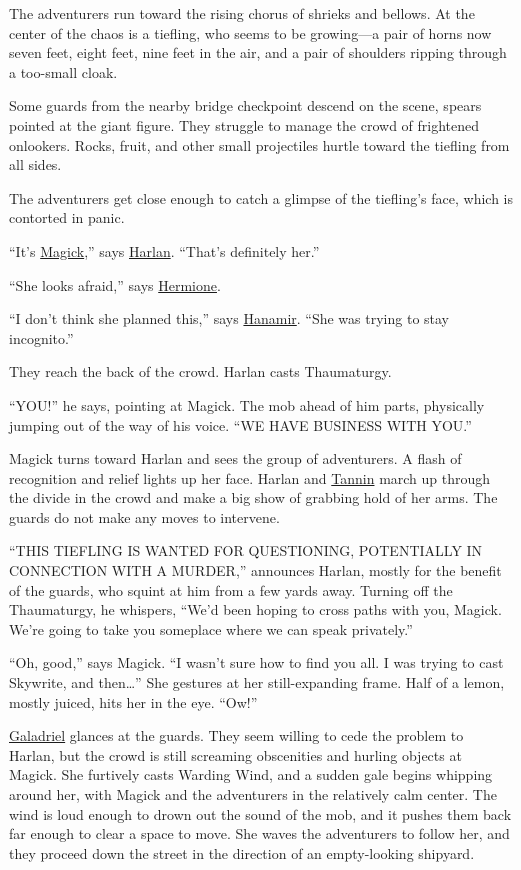 \documentclass[smalldemyvopaper,11pt,twoside,onecolumn,openright,extrafontsizes]{memoir}
\begin{document}
The adventurers run toward the rising chorus of shrieks and bellows. At
the center of the chaos is a tiefling, who seems to be growing---a pair
of horns now seven feet, eight feet, nine feet in the air, and a pair of
shoulders ripping through a too-small cloak.

Some guards from the nearby bridge checkpoint descend on the scene,
spears pointed at the giant figure. They struggle to manage the crowd of
frightened onlookers. Rocks, fruit, and other small projectiles hurtle
toward the tiefling from all sides.

The adventurers get close enough to catch a glimpse of the tiefling's
face, which is contorted in panic.

``It's \href{/characters/magick/}{Magick},'' says
\href{/characters/harlan/}{Harlan}. ``That's definitely her.''

``She looks afraid,'' says \href{/characters/hermione/}{Hermione}.

``I don't think she planned this,'' says
\href{/characters/hanamir/}{Hanamir}. ``She was trying to stay
incognito.''

They reach the back of the crowd. Harlan casts Thaumaturgy.

``YOU!'' he says, pointing at Magick. The mob ahead of him parts,
physically jumping out of the way of his voice. ``WE HAVE BUSINESS WITH
YOU.''

Magick turns toward Harlan and sees the group of adventurers. A flash of
recognition and relief lights up her face. Harlan and
\href{/characters/tannin/}{Tannin} march up through the divide in the
crowd and make a big show of grabbing hold of her arms. The guards do
not make any moves to intervene.

``THIS TIEFLING IS WANTED FOR QUESTIONING, POTENTIALLY IN CONNECTION
WITH A MURDER,'' announces Harlan, mostly for the benefit of the guards,
who squint at him from a few yards away. Turning off the Thaumaturgy, he
whispers, ``We'd been hoping to cross paths with you, Magick. We're
going to take you someplace where we can speak privately.''

``Oh, good,'' says Magick. ``I wasn't sure how to find you all. I was
trying to cast Skywrite, and then\ldots{}'' She gestures at her
still-expanding frame. Half of a lemon, mostly juiced, hits her in the
eye. ``Ow!''

\href{/characters/galadriel/}{Galadriel} glances at the guards. They
seem willing to cede the problem to Harlan, but the crowd is still
screaming obscenities and hurling objects at Magick. She furtively casts
Warding Wind, and a sudden gale begins whipping around her, with Magick
and the adventurers in the relatively calm center. The wind is loud
enough to drown out the sound of the mob, and it pushes them back far
enough to clear a space to move. She waves the adventurers to follow
her, and they proceed down the street in the direction of an
empty-looking shipyard.
\end{document}
